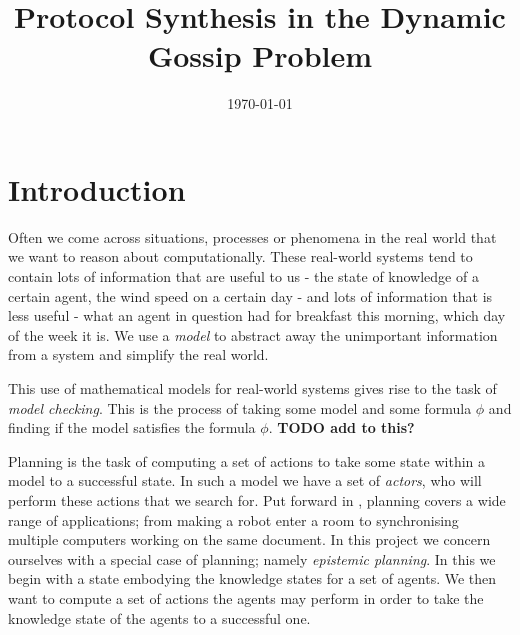 \documentclass[10pt, a4paper]{report}
\title{Protocol Synthesis in the Dynamic Gossip Problem} %
\author{
	\authorstyle{Leo Poulson}
	\newline\newline %
}
\date{\today}
\begin{document}
\maketitle
\thispagestyle{firstpage}

\tableofcontents
\newpage

\chapter{Introduction}
\label{sec:Introduction}

Often we come across situations, processes or phenomena in the real world that
we want to reason about computationally. These real-world systems tend to
contain lots of information that are useful to us - the state of knowledge of a
certain agent, the wind speed on a certain day - and lots of information that is
less useful - what an agent in question had for breakfast this morning, which
day of the week it is. We use a \emph{model} to abstract away the unimportant
information from a system and simplify the real world. 

This use of mathematical models for real-world systems gives rise to the task of
\emph{model checking}. This is the process of taking some model  and some
formula $\phi$ and finding if the model  satisfies the formula $\phi$.
\textbf{TODO add to this? }

Planning is the task of computing a set of actions to take some state within a
model to a successful state. In such a model we have a set of \emph{actors}, who
will perform these actions that we search for. Put forward in
\cite{PlanningBook}, planning covers a wide range of applications; from making a
robot enter a room to synchronising multiple computers working on the same
document. In this project we concern ourselves with a special case of planning;
namely \emph{epistemic planning}. In this we begin with a state embodying the
knowledge states for a set of agents. We then want to compute a set of actions
the agents may perform in order to take the knowledge state of the agents to a
successful one.
\end{document}
